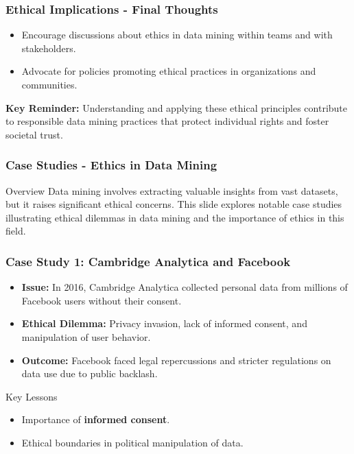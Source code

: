\documentclass[aspectratio=169]{beamer}
\begin{document}
\begin{frame}[fragile]
    \frametitle{Ethical Implications - Final Thoughts}
    \begin{itemize}
        \item Encourage discussions about ethics in data mining within teams and with stakeholders.
        \item Advocate for policies promoting ethical practices in organizations and communities.
    \end{itemize}
    
    \textbf{Key Reminder:} Understanding and applying these ethical principles contribute to responsible data mining practices that protect individual rights and foster societal trust.
\end{frame}

\begin{frame}[fragile]
    \frametitle{Case Studies - Ethics in Data Mining}
    \begin{block}{Overview}
        Data mining involves extracting valuable insights from vast datasets, but it raises significant ethical concerns. 
        This slide explores notable case studies illustrating ethical dilemmas in data mining and the importance of ethics in this field.
    \end{block}
\end{frame}

\begin{frame}[fragile]
    \frametitle{Case Study 1: Cambridge Analytica and Facebook}
    \begin{itemize}
        \item \textbf{Issue:} In 2016, Cambridge Analytica collected personal data from millions of Facebook users without their consent.
        \item \textbf{Ethical Dilemma:} Privacy invasion, lack of informed consent, and manipulation of user behavior.
        \item \textbf{Outcome:} Facebook faced legal repercussions and stricter regulations on data use due to public backlash.
    \end{itemize}
    
    \begin{block}{Key Lessons}
        \begin{itemize}
            \item Importance of \textbf{informed consent}.
            \item Ethical boundaries in political manipulation of data.
        \end{itemize}
    \end{block}
\end{frame}
\end{document}
